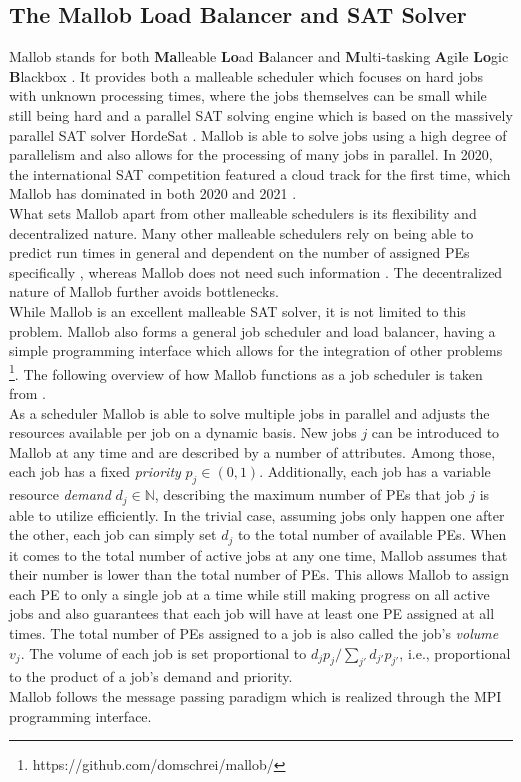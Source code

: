\subsection{The Mallob Load Balancer and SAT Solver}
\label{prelim: mallob}
Mallob stands for both \textbf{Ma}lleable \textbf{Lo}ad \textbf{B}alancer and \textbf{M}ulti-tasking \textbf{A}gi\textbf{l}e \textbf{Lo}gic \textbf{B}lackbox \cite{schreiber2021scalable}.
It provides both a malleable scheduler which focuses on hard jobs with unknown processing times, where the jobs themselves can be small while still being hard \cite{sanders2022decentralized} and a parallel SAT solving engine which is based on the massively parallel SAT solver HordeSat \cite{balyo2015hordesat}.
Mallob is able to solve jobs using a high degree of parallelism and also allows for the processing of many jobs in parallel. In 2020, the international SAT competition featured a cloud track for the first time, which Mallob has dominated in both 2020 and 2021 \cite{froleyks2021sat, behnke2021satresults}. \\
What sets Mallob apart from other malleable schedulers is its flexibility and decentralized nature. Many other malleable schedulers rely on being able to predict run times in general and dependent on the number of assigned PEs specifically \cite{blazewicz2006preemptable, sanders2011efficient}, whereas Mallob does not need such information \cite{sanders2022decentralized}. The decentralized nature of Mallob further avoids bottlenecks.
\\
While Mallob is an excellent malleable SAT solver, it is not limited to this problem. Mallob also forms a general job scheduler and load balancer, having a simple programming interface which allows for the integration of other problems \footnote{https://github.com/domschrei/mallob/}. The following overview of how Mallob functions as a job scheduler is taken from \cite{schreiber2021scalable}. \\
As a scheduler Mallob is able to solve multiple jobs in parallel and adjusts the resources available per job on a dynamic basis. New jobs $j$ can be introduced to Mallob at any time and are described by a number of attributes. Among those, each job has a fixed \textit{priority} $p_j \in (0, 1)$. Additionally, each job has a variable resource \textit{demand} $d_j \in \mathbb{N}$, describing the maximum number of PEs that job $j$ is able to utilize efficiently. In the trivial case, assuming jobs only happen one after the other, each job can simply set $d_j$ to the total number of available PEs. When it comes to the total number of active jobs at any one time, Mallob assumes that their number is lower than the total number of PEs. This allows Mallob to assign each PE to only a single job at a time while still making progress on all active jobs and also guarantees that each job will have at least one PE assigned at all times. The total number of PEs assigned to a job is also called the job's \textit{volume} $v_j$. The volume of each job is set proportional to $d_j p_j / \sum_{j'} d_{j'} p_{j'}$, i.e., proportional to the product of a job's demand and priority.\\
Mallob follows the message passing paradigm which is realized through the MPI programming interface.

